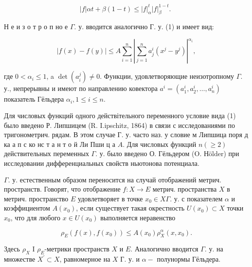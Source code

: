 \documentclass[10pt]{article}
\begin{document}
\[

|f| \alpha t+\beta(1-t) \leqslant|f|_{\alpha}^{t}|f|_{\beta}^{1-t} \text {. }

\]



Н е и з о т р о п но е $\Gamma$. у. вводится аналогично Г. у. (1) и имеет вид:



\[

|f(x)-f(y)| \leqslant A \sum_{i=1}^{n}\left|\sum_{j=1}^{n} a_{j}^{i}\left(x^{j}-y^{j}\right)\right|^{\alpha_{i}},

\]



где $0<\alpha_{i} \leqslant 1$, a $\operatorname{det}\left(a_{i}^{j}\right) \neq 0$. Функции, удовлетворяющие неизотропному $\Gamma$. у., непрерывны и имеют по направлению ковектора $a^{i}=\left(a_{1}^{i}, a_{2}^{i}, \ldots, a_{n}^{i}\right)$ показатель Гёльдера $\alpha_{i}, 1 \leqslant i \leqslant n$.



Для числовых функций одного действітельного переменного условие вида (1) было введено Р. Липшицем (R. I.ipschitz, 1864) в связи с исследованиями по тригонометрич. рядам. В этом случае Г. у. часто наз. у словие м Липшица поря д ка $а$ п с ко нс т а н т о й Ли Пши ц а $A$. Для числовых функций $n(\geqslant 2)$ действительных переменных $\Gamma$. у. было введено О. Гёльдером (O. Нölder) при исследовании дифференциальных свойств ньютонова потенциала.



$\Gamma$. у. естественным образом переносится на случай отображений метрич. пространств. Говорят, что отображение $f: X \rightarrow E$ метрич. пространства $X$ в метрич. пространство $E$ удовлетворяет в точке $x_{0} \in X \Gamma$. у. с показателем $\alpha$ и коэффициентом $A\left(x_{0}\right)$, если существует такая окрестность $U\left(x_{0}\right) \subset X$ точки $x_{0}$, что для любого $x \in U\left(x_{0}\right)$ выполняется неравенство



\[

\rho_{E}\left(f(x), f\left(x_{0}\right)\right) \leqslant A\left(x_{0}\right) \rho_{X}^{\alpha}\left(x, x_{0}\right) .

\]



Здесь $\rho_{X}$ I $\rho_{E}$-метрики пространств $X$ и $E$. Аналогично вводится $\Gamma$. у. на множестве $X^{\prime} \subset X$, равномерное на $X$ Г. у. и $\alpha-$ полунормы Гёльдера.
\end{document}
